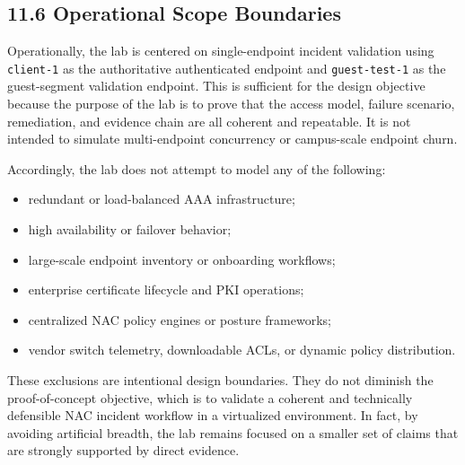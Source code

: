 \documentclass[11pt]{article}
\begin{document}
\subsection{11.6 Operational Scope Boundaries}
\label{sec:operational-scope-boundaries}

Operationally, the lab is centered on single-endpoint incident validation using \texttt{client-1} as the authoritative authenticated endpoint and \texttt{guest-test-1} as the guest-segment validation endpoint. This is sufficient for the design objective because the purpose of the lab is to prove that the access model, failure scenario, remediation, and evidence chain are all coherent and repeatable. It is not intended to simulate multi-endpoint concurrency or campus-scale endpoint churn.

Accordingly, the lab does not attempt to model any of the following:

\begin{itemize}
    \item redundant or load-balanced AAA infrastructure;
    \item high availability or failover behavior;
    \item large-scale endpoint inventory or onboarding workflows;
    \item enterprise certificate lifecycle and PKI operations;
    \item centralized NAC policy engines or posture frameworks;
    \item vendor switch telemetry, downloadable ACLs, or dynamic policy distribution.
\end{itemize}

These exclusions are intentional design boundaries. They do not diminish the proof-of-concept objective, which is to validate a coherent and technically defensible NAC incident workflow in a virtualized environment. In fact, by avoiding artificial breadth, the lab remains focused on a smaller set of claims that are strongly supported by direct evidence.

\end{document}
